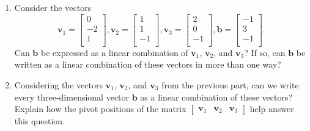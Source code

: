 \documentclass[12pt]{article}
\newcommand{\vs}[1]{\vspace{#1in}}
\newcommand{\bvec}{{\mathbf b}}
\newcommand{\vvec}{{\mathbf v}}
\begin{document}
\begin{enumerate}
  \vs{2.5}
  
\item Consider the vectors
  $$
  \vvec_1 =
  \left[
    \begin{array}{r} 0 \\ -2 \\ 1 \\  \end{array}
  \right], 
  \vvec_2 =
  \left[
    \begin{array}{r} 1 \\ 1 \\ -1 \\  \end{array}
  \right], 
  \vvec_3 =
  \left[
    \begin{array}{r} 2 \\ 0 \\ -1 \\  \end{array}
  \right], 
  \bvec   =
  \left[
    \begin{array}{r} -1 \\ 3 \\ -1 \\ \end{array}
  \right].
  $$
  Can $\bvec$ be expressed as a linear combination of
  $\vvec_1$, $\vvec_2$, and $\vvec_3$?  If so,
  can $\bvec$ be written as a linear combination of these
  vectors in more than one way?

  \vs{2}
  \newpage
\item Considering the vectors $\vvec_1$,
  $\vvec_2$, and $\vvec_3$ from the previous part, can
  we write every three-dimensional vector $\bvec$ as
  a linear combination of these vectors?  Explain how the pivot
  positions of the matrix
  $\left[
    \begin{array}{rrr}
      \vvec_1 & \vvec_2 & \vvec_3
    \end{array}
  \right]$
  help answer this question. 


\end{enumerate}
\end{document}
